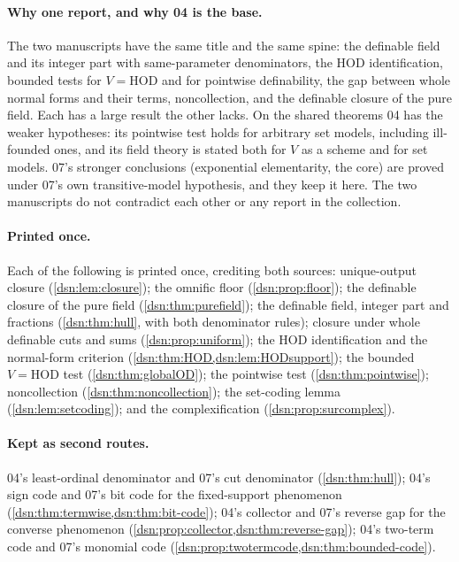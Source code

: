 \documentclass[11pt,a4paper]{article}
\numberwithin{equation}{section}
\theoremstyle{definition}
\theoremstyle{remark}
\newcommand{\HOD}{\mathrm{HOD}}
\begin{document}
\paragraph{Why one report, and why 04 is the base.}
The two manuscripts have the same title and the same spine: the definable
field and its integer part with same-parameter denominators, the $\HOD$
identification, bounded tests for $V=\HOD$ and for pointwise
definability, the gap between whole normal forms and their terms,
noncollection, and the definable closure of the pure field. Each has a
large result the other lacks. On the shared theorems 04 has the weaker
hypotheses: its pointwise test holds for arbitrary set models, including
ill-founded ones, and its field theory is stated both for $V$ as a scheme
and for set models. 07's stronger conclusions (exponential elementarity,
the core) are proved under 07's own transitive-model hypothesis, and they
keep it here. The two manuscripts do not contradict each other or any
report in the collection.

\paragraph{Printed once.} Each of the following is printed once, crediting
both sources: unique-output closure (\cref{dsn:lem:closure}); the omnific
floor (\cref{dsn:prop:floor}); the definable closure of the pure field
(\cref{dsn:thm:purefield}); the definable field, integer part and fractions
(\cref{dsn:thm:hull}, with both denominator rules); closure under whole
definable cuts and sums (\cref{dsn:prop:uniform}); the $\HOD$
identification and the normal-form criterion
(\cref{dsn:thm:HOD,dsn:lem:HODsupport}); the bounded $V=\HOD$ test
(\cref{dsn:thm:globalOD}); the pointwise test (\cref{dsn:thm:pointwise});
noncollection (\cref{dsn:thm:noncollection}); the set-coding lemma
(\cref{dsn:lem:setcoding}); and the complexification
(\cref{dsn:prop:surcomplex}).

\paragraph{Kept as second routes.} 04's least-ordinal denominator and
07's cut denominator (\cref{dsn:thm:hull}); 04's sign code and 07's bit code
for the fixed-support phenomenon (\cref{dsn:thm:termwise,dsn:thm:bit-code});
04's collector and 07's reverse gap for the converse phenomenon
(\cref{dsn:prop:collector,dsn:thm:reverse-gap}); 04's two-term code and
07's monomial code (\cref{dsn:prop:twotermcode,dsn:thm:bounded-code}).
\end{document}
